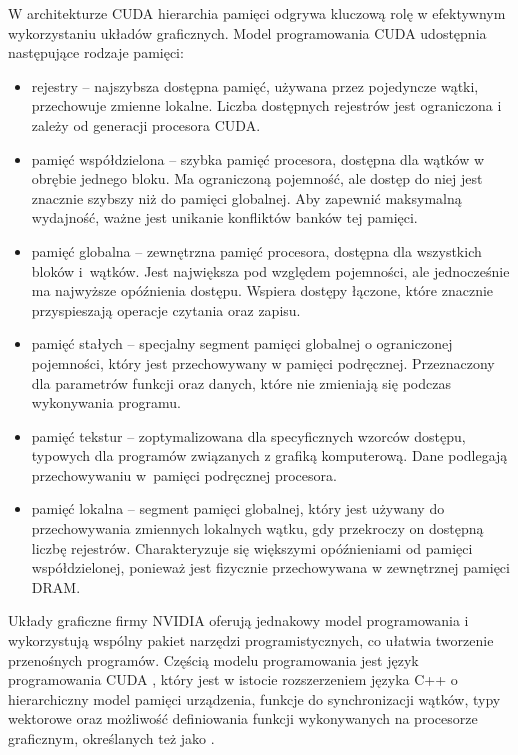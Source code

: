 W architekturze CUDA hierarchia pamięci odgrywa kluczową rolę w efektywnym wykorzystaniu
układów graficznych. Model programowania CUDA udostępnia następujące rodzaje pamięci:
\begin{itemize}
      \item rejestry -- najszybsza dostępna pamięć, używana przez pojedyncze wątki, przechowuje
            zmienne lokalne. Liczba dostępnych rejestrów jest ograniczona i zależy od generacji procesora CUDA.
      \item pamięć współdzielona -- szybka pamięć procesora, dostępna dla wątków w obrębie jednego bloku.
            Ma ograniczoną pojemność, ale dostęp do niej jest znacznie szybszy niż do pamięci globalnej.
            Aby zapewnić maksymalną wydajność, ważne jest unikanie konfliktów banków tej pamięci.
      \item pamięć globalna -- zewnętrzna pamięć procesora, dostępna dla wszystkich bloków i~wątków.
            Jest największa pod względem pojemności, ale jednocześnie ma najwyższe opóźnienia dostępu.
            Wspiera dostępy łączone, które znacznie przyspieszają operacje czytania oraz zapisu.
      \item pamięć stałych -- specjalny segment pamięci globalnej o ograniczonej pojemności, który
            jest przechowywany w pamięci podręcznej. Przeznaczony dla parametrów funkcji oraz danych,
            które nie zmieniają się podczas wykonywania programu.
      \item pamięć tekstur -- zoptymalizowana dla specyficznych wzorców dostępu, typowych dla programów
            związanych z grafiką komputerową. Dane podlegają przechowywaniu w~pamięci podręcznej procesora.
      \item pamięć lokalna -- segment pamięci globalnej, który jest używany do przechowywania zmiennych
            lokalnych wątku, gdy przekroczy on dostępną liczbę rejestrów. Charakteryzuje się większymi
            opóźnieniami od pamięci współdzielonej, ponieważ jest fizycznie przechowywana w zewnętrznej pamięci DRAM.
\end{itemize}

Układy graficzne firmy NVIDIA oferują jednakowy model programowania i wykorzystują wspólny pakiet narzędzi
programistycznych, co ułatwia tworzenie przenośnych programów. Częścią modelu programowania jest język
programowania CUDA \cite{cuda-by-example}, który jest w istocie rozszerzeniem języka C++ o hierarchiczny
model pamięci urządzenia, funkcje do synchronizacji wątków, typy wektorowe oraz możliwość definiowania
funkcji wykonywanych na procesorze graficznym, określanych też jako .

